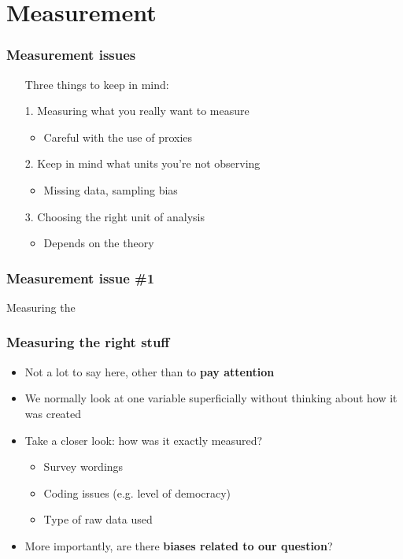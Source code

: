 \documentclass[aspectratio=43]{beamer}
\begin{document}
\section{Measurement}

\begin{frame}
\frametitle{Measurement issues}
\centering

\begin{itemize}
  \item[] Three things to keep in mind:
  \item[1.] Measuring what you really want to measure
  \begin{itemize}
    \item Careful with the use of proxies
  \end{itemize}
  \item[2.] Keep in mind what units you're not observing
  \begin{itemize}
    \item Missing data, sampling bias
  \end{itemize}
  \item[3.] Choosing the right unit of analysis
  \begin{itemize}
    \item Depends on the theory
  \end{itemize}
\end{itemize}

\end{frame}

\begin{frame}
\frametitle{Measurement issue \#1}
\centering

Measuring the 

\end{frame}
  

\begin{frame}
\frametitle{Measuring the right stuff}
\centering

\begin{itemize}
  \item Not a lot to say here, other than to \textbf{pay attention}
  \item We normally look at one variable superficially without thinking about how it was created
  \item<2-> Take a closer look: how was it exactly measured?
  \begin{itemize}
    \item Survey wordings
    \item Coding issues (e.g. level of democracy)
    \item Type of raw data used
  \end{itemize}
  \item<3-> More importantly, are there \textbf{biases related to our question}?
\end{itemize}

\end{frame}
\end{document}
